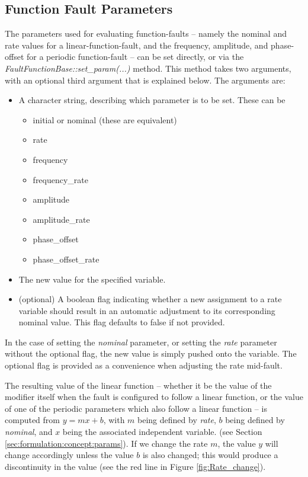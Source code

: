 \documentclass[11pt,fleqn]{report}
\begin{document}
\subsection{Function Fault Parameters} \label{sec:formulation:fault:params}

The parameters used for evaluating function-faults -- namely the nominal
and rate values for a linear-function-fault, and the frequency, amplitude, and
phase-offset for a periodic function-fault -- can be set directly, or via the
\textit{FaultFunctionBase::set\_param(...)} method. This method takes two
arguments, with an optional third argument that is explained below. The
arguments are:

\begin{itemize}
 \item A character string, describing which parameter is to be set. These can be
  \begin{itemize}
   \item initial or nominal (these are equivalent)
   \item rate
   \item frequency
   \item frequency\_rate
   \item amplitude
   \item amplitude\_rate
   \item phase\_offset
   \item phase\_offset\_rate
  \end{itemize}
 \item The new value for the specified variable.
 \item (optional) A boolean flag indicating whether a new assignment to a rate
   variable should result in an automatic adjustment to its corresponding
   nominal value. This flag defaults to false if not provided.
\end{itemize}

In the case of setting the \textit{nominal} parameter, or setting the
\textit{rate} parameter without the optional flag, the new value is simply
pushed onto the variable. The optional flag is provided as a convenience when
adjusting the rate mid-fault.

The resulting value of the linear function -- whether it be the value of the
modifier itself when the fault is configured to follow a linear function, or the
value of one of the periodic parameters which also follow a linear function --
is computed from $y = mx +b$, with $m$ being defined by \textit{rate}, $b$ being
defined by \textit{nominal}, and $x$ being the associated independent variable.
(see Section \ref{sec:formulation:concept:params}).
If we change the rate $m$, the value $y$ will change accordingly unless the
value $b$ is also changed; this would produce a discontinuity in the value (see
the red line in Figure \ref{fig:Rate_change}).
\end{document}
